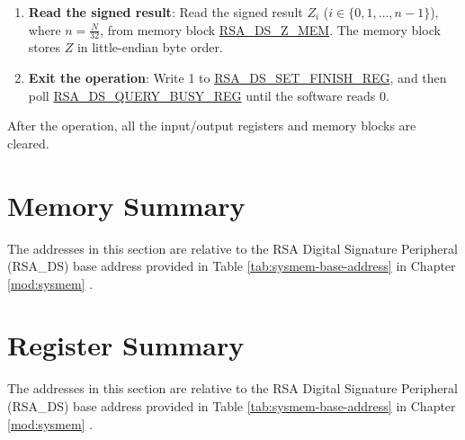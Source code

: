 \documentclass[main\_\_EN.tex]{subfiles}
\begin{document}
\begin{enumerate}
    \item {\bfseries Read the signed result}: Read the signed result \begin{math}Z_{i}\end{math} (\begin{math}i \in \{0,1,\dots,n-1\}\end{math}), where \begin{math} n = \frac{N}{32} \end{math}, from memory block \hyperref[RSADSZMEM]{RSA\_DS\_Z\_MEM}. The memory block stores \begin{math}Z\end{math} in little-endian byte order.

    \item {\bfseries Exit the operation\label{other:digsig-step-exit}}: Write 1 to \hyperref[regdesc:RSADSSETFINISHREG]{RSA\_DS\_SET\_FINISH\_REG}, and then poll \hyperref[regdesc:RSADSQUERYBUSYREG]{RSA\_DS\_QUERY\_BUSY\_REG} until the software reads 0.

\end{enumerate}

After the operation, all the input/output registers and memory blocks are cleared.


\newpage
\section{Memory Summary}
\label{sec:digsig-mem-summ}

The addresses in this section are relative to the RSA Digital Signature Peripheral (RSA\_DS) base address provided in Table \ref{tab:sysmem-base-address} in Chapter \ref{mod:sysmem} \textit{}.






\newpage
\hypertarget{digsig-reg-summ}{}
\section{Register Summary}
\label{sec:digsig-reg-summ}

The addresses in this section are relative to the RSA Digital Signature Peripheral (RSA\_DS) base address provided in Table \ref{tab:sysmem-base-address} in Chapter \ref{mod:sysmem} \textit{}.
\end{document}

